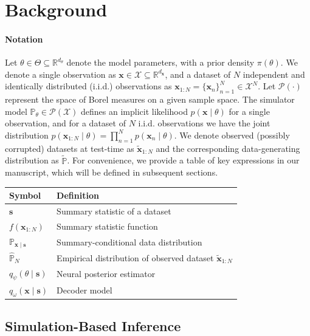 \documentclass{article}
\theoremstyle{plain}
\theoremstyle{definition}
\theoremstyle{remark}
\begin{document}
\section{Background}
\paragraph{Notation}
Let \( \theta \in \Theta \subseteq \mathbb{R}^{d_\theta} \) denote the model parameters, with a prior density \( \pi(\theta) \). We denote a single observation as \( \mathbf{x} \in \mathcal{X} \subseteq \mathbb{R}^{d_\mathbf{x}} \), and a dataset of \( N \) independent and identically distributed (i.i.d.) observations as \( \mathbf{x}_{1:N} = \{\mathbf{x}_n\}_{n=1}^N \in \mathcal{X}^N \). Let \( \mathcal{P}(\cdot) \) represent the space of Borel measures on a given sample space. The simulator model \( \mathbb{P}_\theta \in \mathcal{P}(\mathcal{X}) \) defines an implicit likelihood \( p(\mathbf{x} \mid \theta) \) for a single observation, and for a dataset of \( N \) i.i.d. observations we have the joint distribution \( p(\mathbf{x}_{1:N} \mid \theta) = \prod_{n=1}^N p(\mathbf{x}_n \mid \theta) \). We denote observed (possibly corrupted) datasets at test-time as \( \tilde{\mathbf{x}}_{1:N} \) and the corresponding data-generating distribution as \( \tilde{\mathbb{P}} \). For convenience, we provide a table of key expressions in our manuscript, which will be defined in subsequent sections.

\begin{table}[h]
\centering
\label{tab:notation}
\begin{tabularx}{\linewidth}{@{}lX@{}}
\toprule
Symbol & Definition \\
\midrule
$\mathbf{s}$ & Summary statistic of a dataset \\
$f(\mathbf{x}_{1:N})$ & Summary statistic function \\
$\mathbb{P}_{\mathbf{x} \mid \mathbf{s}}$ & Summary-conditional data distribution  \\
$\hat{\mathbb{P}}_N$ & Empirical distribution of observed dataset \( \tilde{\mathbf{x}}_{1:N} \) \\
$q_\psi(\theta \mid \mathbf{s})$ & Neural posterior estimator \\
$q_\omega(\mathbf{x} \mid \mathbf{s})$ & Decoder model \\
\bottomrule
\end{tabularx}
\end{table}

\subsection{Simulation-Based Inference}
\label{sec: bg-sbi}
\end{document}
